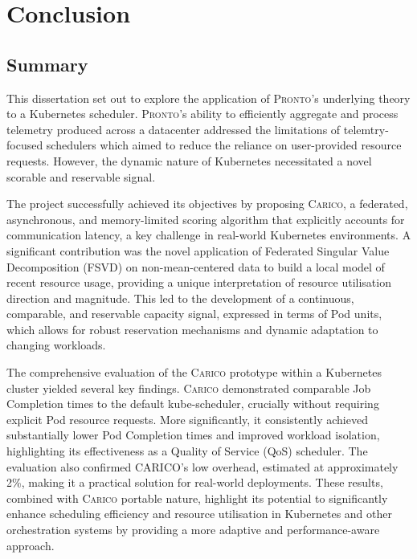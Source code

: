 \chapter{Conclusion}

%
%

\section{Summary}
This dissertation set out to explore the application of \textsc{Pronto}'s
underlying theory to a Kubernetes scheduler. \textsc{Pronto}'s ability to
efficiently aggregate and process telemetry produced across a datacenter
addressed the limitations of telemtry-focused schedulers which aimed to reduce
the reliance on user-provided resource requests. However, the dynamic nature of
Kubernetes necessitated a novel scorable and reservable signal.

The project successfully achieved its objectives by proposing \textsc{Carico}, a
federated, asynchronous, and memory-limited scoring algorithm that explicitly
accounts for communication latency, a key challenge in real-world Kubernetes
environments. A significant contribution was the novel application of Federated
Singular Value Decomposition (FSVD) on non-mean-centered data to build a local
model of recent resource usage, providing a unique interpretation of resource
utilisation direction and magnitude. This led to the development of a
continuous, comparable, and reservable capacity signal, expressed in terms of
Pod units, which allows for robust reservation mechanisms and dynamic adaptation
to changing workloads.

The comprehensive evaluation of the \textsc{Carico} prototype within a Kubernetes cluster
yielded several key findings. \textsc{Carico} demonstrated comparable Job
Completion times to the default kube-scheduler, crucially without requiring
explicit Pod resource requests. More significantly, it consistently achieved
substantially lower Pod Completion times and improved workload isolation,
highlighting its effectiveness as a Quality of Service (QoS) scheduler. The
evaluation also confirmed CARICO's low overhead, estimated at approximately 2\%,
making it a practical solution for real-world deployments. These results,
combined with \textsc{Carico} portable nature, highlight its potential to
significantly enhance scheduling efficiency and resource utilisation in
Kubernetes and other orchestration systems by providing a more adaptive and
performance-aware approach.

